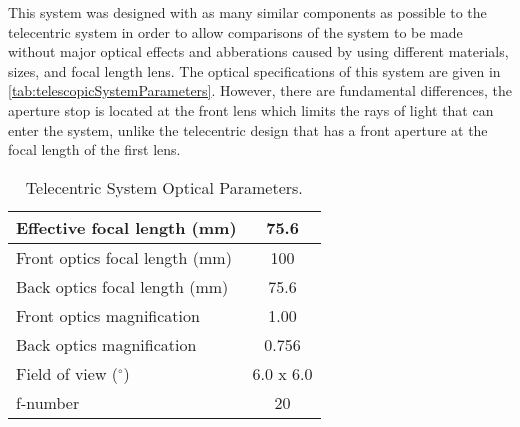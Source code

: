 


This system was designed with as many similar components as possible to the telecentric system in order to allow comparisons of the system to be made without major optical effects and abberations caused by using different materials, sizes, and focal length lens. The optical specifications of this system are given in \autoref{tab:telescopicSystemParameters}. However, there are fundamental differences, the aperture stop is located at the front lens which limits the rays of light that can enter the system, unlike the telecentric design that has a front aperture at the focal length of the first lens.


\begin{table}[h!]
    \begin{center}
    \begin{tabular}{|l|c|}
    \hline
    Effective focal length (mm) & 75.6 \\
    \hline
    Front optics focal length (mm) & 100 \\
    \hline
    Back optics focal length (mm) & 75.6 \\
    \hline
    Front optics magnification & 1.00 \\
    \hline
    Back optics magnification & 0.756 \\
    \hline
    Field of view ($^{\circ}$) & 6.0 x 6.0 \\
    \hline
    f-number & 20 \\
    \hline
    \end{tabular}
    \end{center}
    \caption{Telecentric System Optical Parameters.}
    \label{tab:telescopicSystemParameters}
\end{table}


